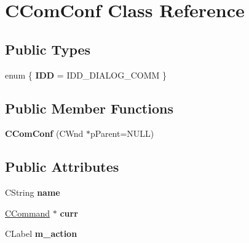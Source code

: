 \hypertarget{class_c_com_conf}{\section{C\-Com\-Conf Class Reference}
\label{class_c_com_conf}
}
\subsection*{Public Types}
\begin{DoxyCompactItemize}
\item 
enum \{ {\bfseries I\-D\-D} =  I\-D\-D\-\_\-\-D\-I\-A\-L\-O\-G\-\_\-\-C\-O\-M\-M
 \}
\end{DoxyCompactItemize}
\subsection*{Public Member Functions}
\begin{DoxyCompactItemize}
\item 
\hypertarget{class_c_com_conf_aba68c2d6cec963704936c3aeac453b31}{{\bfseries C\-Com\-Conf} (C\-Wnd $\ast$p\-Parent=N\-U\-L\-L)}\label{class_c_com_conf_aba68c2d6cec963704936c3aeac453b31}

\end{DoxyCompactItemize}
\subsection*{Public Attributes}
\begin{DoxyCompactItemize}
\item 
\hypertarget{class_c_com_conf_a09cd9bb96b5e6625c700495519868b99}{C\-String {\bfseries name}}\label{class_c_com_conf_a09cd9bb96b5e6625c700495519868b99}

\item 
\hypertarget{class_c_com_conf_aef8c27d16c8151fcbff894134c8d6460}{\hyperlink{class_c_command}{C\-Command} $\ast$ {\bfseries curr}}\label{class_c_com_conf_aef8c27d16c8151fcbff894134c8d6460}

\item 
\hypertarget{class_c_com_conf_a84f6996dc9a5189e92767ac69f4efdcc}{C\-Label {\bfseries m\-\_\-action}}\label{class_c_com_conf_a84f6996dc9a5189e92767ac69f4efdcc}

\end{DoxyCompactItemize}
